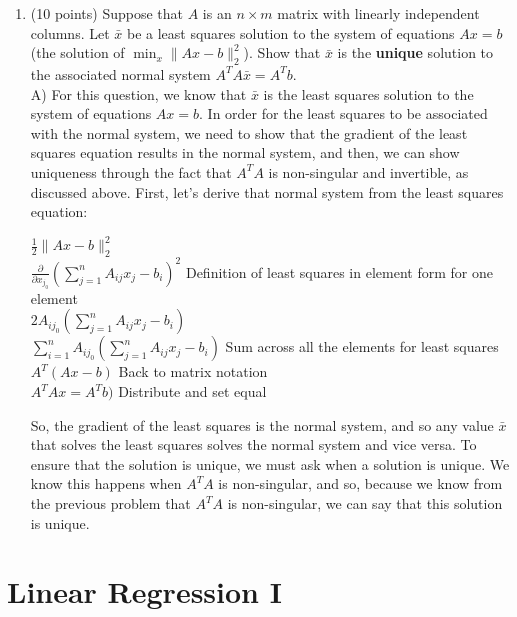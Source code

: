 \documentclass[11pt]{article}
\begin{document}
\begin{enumerate}
\item (10 points) Suppose that $A$ is an $n \times m$ matrix with linearly independent columns.
      Let $\bar x$ be a least squares solution to the system of equations $Ax = b$ (the solution of $\min_x \|Ax - b\|_2^2$).
      Show that $\bar x$ is the \textbf{unique} solution to the associated normal system 
      $A^T A \bar x = A^T b$. \\
      A) For this question, we know that $\bar x$ is the least squares solution to the system of equations $Ax = b$. In order for 
      the least squares to be associated with the normal system, we need to show that the gradient of the least squares equation
      results in the normal system, and then, we can show uniqueness through the fact that $A^TA$ is non-singular and invertible, 
      as discussed above. First, let's derive that normal system from the least squares equation:
      \begin{center}
           $\frac{1}{2}\|Ax - b\|_2^2$ \\
           $\frac{\partial }{\partial x_{j_0}} (\sum_{j=1}^{n} A_{ij}x_j - b_i )^2$ Definition of least squares in element form for one element\\
           $2A_{ij_0}(\sum_{j=1}^{n} A_{ij}x_j - b_i )$ \\
           $\sum_{i=1}^{n}A_{ij_0}(\sum_{j=1}^{n} A_{ij}x_j - b_i )$ Sum across all the elements for least squares \\
           $A^T(Ax - b)$ Back to matrix notation \\
           $A^TAx = A^Tb)$ Distribute and set equal \\
      \end{center}
      So, the gradient of the least squares is the normal system, and so any value $\bar x$ that solves the least
      squares solves the normal system and vice versa. To ensure that the solution is unique, we must ask when 
      a solution is unique. We know this happens when $A^TA$ is non-singular, and so, because we know from the
      previous problem that $A^TA$ is non-singular, we can say that this solution is unique.

\end{enumerate}


\section{Linear Regression I} 
\end{document}
